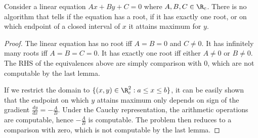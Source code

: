 \begin{theorem}
	Consider a linear equation $Ax+By+C=0$ where $A,B,C \in \R_c$. There is no algorithm that tells if the equation has a root, if it has exactly one root, or on which endpoint of a closed interval of $x$ it attains maximum for $y$.
\end{theorem}
\begin{proof}
	The linear equation has no root iff  $A = B = 0$ and  $C \neq 0$. It has infinitely many roots iff $A = B = C = 0$. It has exactly one root iff either  $A \neq 0$ or $B \neq 0$. The RHS of the equivalences above are simply comparison with 0, which are not computable by the last lemma.

	If we restrict the domain to $\{\left(x,y  \right) \in \R_c^2 : a\le x\le b \}$, it can be easily shown that the endpoint on which $y$ attains maximum only depends on sign of the gradient $\frac{dy}{dx} = - \frac{A}{B}$. Under the Cauchy representation, the arithmetic operations are computable, hence $-\frac{A}{B}$ is computable. The problem then reduces to a comparison with zero, which is not computable by the last lemma. 
\end{proof}
